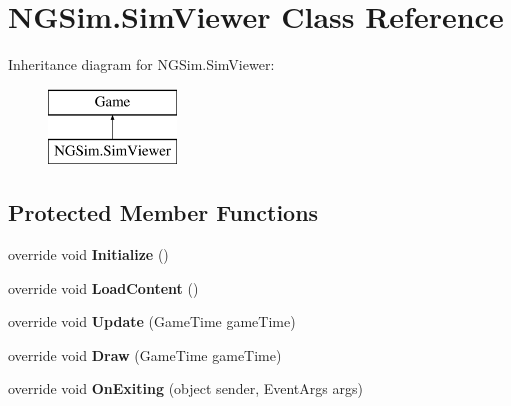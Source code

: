 \hypertarget{class_n_g_sim_1_1_sim_viewer}{}\section{N\+G\+Sim.\+Sim\+Viewer Class Reference}
\label{class_n_g_sim_1_1_sim_viewer}
Inheritance diagram for N\+G\+Sim.\+Sim\+Viewer\+:\begin{figure}[H]
\begin{center}
\leavevmode
\includegraphics[height=2.000000cm]{class_n_g_sim_1_1_sim_viewer}
\end{center}
\end{figure}
\subsection*{Protected Member Functions}
\begin{DoxyCompactItemize}
\item 
\mbox{\label{class_n_g_sim_1_1_sim_viewer_a67ea4b1b183574eea520da92500ca82c}} 
override void {\bfseries Initialize} ()
\item 
\mbox{\label{class_n_g_sim_1_1_sim_viewer_a1846e44145a48125caa1310cbe116fae}} 
override void {\bfseries Load\+Content} ()
\item 
\mbox{\label{class_n_g_sim_1_1_sim_viewer_ac487a2f0fa9c932c28dda8d7a7cfdd77}} 
override void {\bfseries Update} (Game\+Time game\+Time)
\item 
\mbox{\label{class_n_g_sim_1_1_sim_viewer_a526ba2d7c3e30f3ecacb8e1eb2f76ac5}} 
override void {\bfseries Draw} (Game\+Time game\+Time)
\item 
\mbox{\label{class_n_g_sim_1_1_sim_viewer_a234b7db75047477380dfd34729738978}} 
override void {\bfseries On\+Exiting} (object sender, Event\+Args args)
\end{DoxyCompactItemize}
